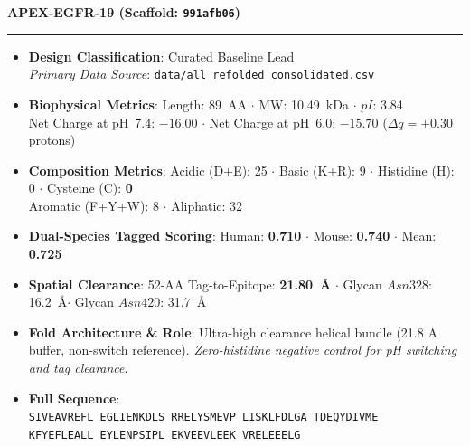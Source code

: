 \documentclass[11pt]{article}
\begin{document}
\noindent\textbf{\color{navyblue}\large APEX-EGFR-19  \quad (Scaffold: \texttt{991afb06})} \\
\vspace{-0.4em}
\rule{\textwidth}{0.6pt}
\vspace{-0.2em}
\begin{itemize}
  \setlength{\itemsep}{2pt}
  \setlength{\parskip}{0pt}
  \item \textbf{Design Classification}: Curated Baseline Lead \\
    \textit{Primary Data Source}: \texttt{\small data/all\_refolded\_consolidated.csv}
  \item \textbf{Biophysical Metrics}: Length: 89~AA $\cdot$ MW: 10.49~kDa $\cdot$ $pI$: 3.84 \\
    Net Charge at pH~7.4: $-16.00$ $\cdot$ Net Charge at pH~6.0: $-15.70$ ($\Delta q = +0.30$ protons)
  \item \textbf{Composition Metrics}: Acidic (D+E): 25 $\cdot$ Basic (K+R): 9 $\cdot$ Histidine (H): 0 $\cdot$ Cysteine (C): \textbf{0} \\
    Aromatic (F+Y+W): 8 $\cdot$ Aliphatic: 32
  \item \textbf{Dual-Species Tagged Scoring}: Human: \textbf{0.710} $\cdot$ Mouse: \textbf{0.740} $\cdot$ Mean: \textbf{0.725}
  \item \textbf{Spatial Clearance}: 52-AA Tag-to-Epitope: \textbf{21.80~\AA} $\cdot$ Glycan $Asn328$: 16.2~\AA $\cdot$ Glycan $Asn420$: 31.7~\AA
  \item \textbf{Fold Architecture \& Role}: Ultra-high clearance helical bundle (21.8 A buffer, non-switch reference). \textit{Zero-histidine negative control for pH switching and tag clearance}.
  \item \textbf{Full Sequence}: \\
    \texttt{\small SIVEAVREFL EGLIENKDLS RRELYSMEVP LISKLFDLGA TDEQYDIVME \\
    KFYEFLEALL EYLENPSIPL EKVEEVLEEK VRELEEELG}
\end{itemize}
\vspace{0.8em}
\end{document}
